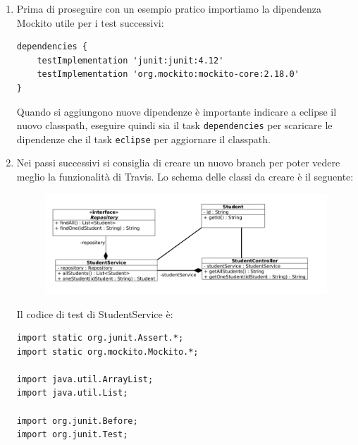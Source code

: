 \begin{enumerate}
\begin{figure}[H]
  \end{figure}
  Cliccandoci si apre una finestra in cui potrete scegliere il branch e la modalità di import, nel nostro caso avremo bisogno del codice markdown che corrisponderà ad una istruzione di questo tipo: 
    \begin{verbatim}
     [![Build Status]
     (https://travis-ci.org/<User>/<gitRepositoryName>.svg?branch=master)]
     (https://travis-ci.org/<User>/<gitRepositoryName>))
  \end{verbatim}
  Copiamo e incolliamo (con le dovute modifiche) direttamente nel README.md ottenendo il risultato mostrato sopra.
  \item Prima di proseguire con un esempio pratico importiamo la dipendenza Mockito utile per i test successivi:
  \begin{lstlisting}[frame=single]
dependencies {
    testImplementation 'junit:junit:4.12'
    testImplementation 'org.mockito:mockito-core:2.18.0'
}\end{lstlisting}
    Quando si aggiungono nuove dipendenze è importante indicare a eclipse il nuovo classpath, eseguire quindi sia il task \texttt{dependencies} per scaricare le dipendenze che il task \texttt{eclipse} per aggiornare il classpath.
    \item Nei passi successivi si consiglia di creare un nuovo branch per poter vedere meglio la funzionalità di Travis. Lo schema delle classi da creare è il seguente:
  \begin{figure}[H]
    \centering
    \includegraphics[width=1.0\linewidth]{4IntegrationWithOtherTool/tutorial/classDiagramm.png}
  \end{figure}
  Il codice di test di StudentService è:
  \begin{lstlisting}[frame=single]
import static org.junit.Assert.*;
import static org.mockito.Mockito.*;

import java.util.ArrayList;
import java.util.List;

import org.junit.Before;
import org.junit.Test;


\end{lstlisting}
\end{enumerate}
